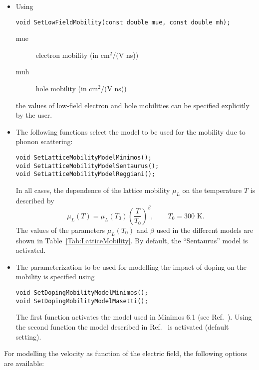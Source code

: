 \begin{itemize}
  \item
  Using 
  \begin{lstlisting}
void SetLowFieldMobility(const double mue, const double mh);
  \end{lstlisting}
  \begin{description}
    \item[mue] electron mobility (in cm\(^{2}\)/(V ns))
    \item[muh] hole mobility (in cm\(^{2}\)/(V ns))
  \end{description}
  the values of low-field electron and hole mobilities
  can be specified explicitly by the user.
  \item
  The following functions select the model to be used for the 
  mobility due to phonon scattering:
  \begin{lstlisting}
void SetLatticeMobilityModelMinimos();
void SetLatticeMobilityModelSentaurus();
void SetLatticeMobilityModelReggiani();
  \end{lstlisting} 
  In all cases, the dependence of the lattice mobility \(\mu_{L}\) 
  on the temperature \(T\) is described by 
  \begin{equation}\label{Eqn:LatticeMobilityTemperatureDependence}
    \mu_{L}\left(T\right) = \mu_{L}\left(T_{0}\right) 
              \left(\frac{T}{T_{0}}\right)^{\beta}, \qquad T_{0} = 300\text{ K}.
  \end{equation}
  The values of the parameters \(\mu_{L}\left(T_{0}\right)\) and \(\beta\) 
  used in the different models are shown in Table~\ref{Tab:LatticeMobility}. 
  By default, the ``Sentaurus'' model is activated. 
  \item
  The parameterization to be used for modelling the impact of 
  doping on the mobility is specified using
  \begin{lstlisting}
void SetDopingMobilityModelMinimos();
void SetDopingMobilityModelMasetti();
  \end{lstlisting}
  The first function activates the model used in Minimos 6.1 
  (see Ref.~\cite{Haensch1990}). Using the second function the 
  model described in Ref.~\cite{Masetti1983} is activated (default setting).  
\end{itemize}
For modelling the velocity as function of the electric field, 
the following options are available:
